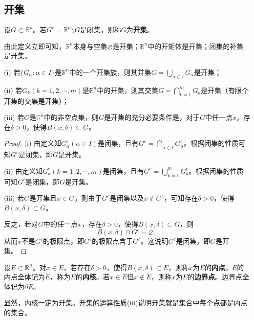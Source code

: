 \documentclass[../../main.tex]{subfiles}
\begin{document}
\subsection{开集}

\begin{definition}[开集]\label{definition:开集}
设\(G\subset\mathbb{R}^n\)。若\(G^c=\mathbb{R}^n\setminus G\)是闭集，则称\(G\)为\textbf{开集}。
\end{definition}
\begin{note}
由此定义立即可知，\(\mathbb{R}^n\)本身与空集\(\varnothing\)是开集；\(\mathbb{R}^n\)中的开矩体是开集；闭集的补集是开集。
\end{note}

\begin{theorem}[开集的运算性质]\label{theorem:开集的运算性质}
(i) 若\(\{G_{\alpha}:\alpha\in I\}\)是\(\mathbb{R}^n\)中的一个开集族，则其并集\(G = \bigcup_{\alpha\in I}G_{\alpha}\)是开集；

(ii) 若\(G_k(k = 1,2,\cdots,m)\)是\(\mathbb{R}^n\)中的开集，则其交集\(G=\bigcap_{k = 1}^{m}G_k\)是开集（有限个开集的交集是开集）；

(iii) 若\(G\)是\(\mathbb{R}^n\)中的非空点集，则\(G\)是开集的充分必要条件是，对于\(G\)中任一点\(x\)，存在\(\delta>0\)，使得\(B(x,\delta)\subset G\)。
\end{theorem}
\begin{proof}
  (i) 由定义知\(G_{\alpha}^c(\alpha\in I)\)是闭集，且有\(G^c=\bigcap_{\alpha\in I}G_{\alpha}^c\)。根据闭集的性质可知\(G^c\)是闭集，即\(G\)是开集。

(ii) 由定义知\(G_k^c(k = 1,2,\cdots,m)\)是闭集，且有\(G^c=\bigcup_{k = 1}^{m}G_k^c\)。根据闭集的性质可知\(G^c\)是闭集，即\(G\)是开集。

(iii) 若\(G\)是开集且\(x\in G\)，则由于\(G^c\)是闭集以及\(x\notin G^c\)，可知存在\(\delta>0\)，使得\(B(x,\delta)\subset G\)。

反之，若对\(G\)中的任一点\(x\)，存在\(\delta>0\)，使得\(B(x,\delta)\subset G\)，则
\[B(x,\delta)\cap G^c=\varnothing,\]
从而\(x\)不是\(G^c\)的极限点，即\(G^c\)的极限点含于\(G^c\)。这说明\(G^c\)是闭集，即\(G\)是开集。

\end{proof}

\begin{definition}[内点与边界点]\label{definition:内点与边界点}
  设\(E\subset\mathbb{R}^n\)。对\(x\in E\)，若存在\(\delta>0\)，使得\(B(x,\delta)\subset E\)，则称\(x\)为\(E\)的\textbf{内点}。\(E\)的内点全体记为\(\mathring{E}\)，称为\(E\)的\textbf{内核}。若\(x\in\overline{E}\)但\(x\notin\mathring{E}\)，则称\(x\)为\(E\)的\textbf{边界点}。边界点全体记为\(\partial E\)。
\end{definition}
\begin{note}
  显然，内核一定为开集。\hyperref[theorem:开集的运算性质]{开集的运算性质(iii)}说明开集就是集合中每个点都是内点的集合。
\end{note}
\end{document}

